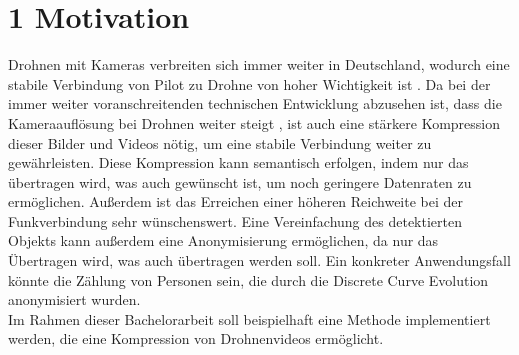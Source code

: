 \documentclass[a4paper,11pt,pdftex, parskip]{scrreprt}
\begin{document}
\section*{1 Motivation}
Drohnen mit Kameras verbreiten sich immer weiter in Deutschland, wodurch eine stabile Verbindung von Pilot zu Drohne von hoher Wichtigkeit ist \citep{Nehring2021}. \newline
Da bei der immer weiter voranschreitenden technischen Entwicklung abzusehen ist, dass die Kameraauflösung bei Drohnen weiter steigt \citep{futuretrends2017}, ist auch eine stärkere Kompression dieser Bilder und Videos nötig, um eine stabile Verbindung weiter zu gewährleisten. Diese Kompression kann semantisch erfolgen, indem nur das übertragen wird, was auch gewünscht ist, um noch geringere Datenraten zu ermöglichen. Außerdem ist das Erreichen einer höheren Reichweite bei der Funkverbindung sehr wünschenswert. \newline
Eine Vereinfachung des detektierten Objekts kann außerdem eine Anonymisierung ermöglichen, da nur das Übertragen wird, was auch übertragen werden soll. Ein konkreter Anwendungsfall könnte die Zählung von Personen sein, die durch die Discrete Curve Evolution anonymisiert wurden.\\
Im Rahmen dieser Bachelorarbeit soll beispielhaft eine Methode implementiert werden, die eine Kompression von Drohnenvideos ermöglicht.
\end{document}
